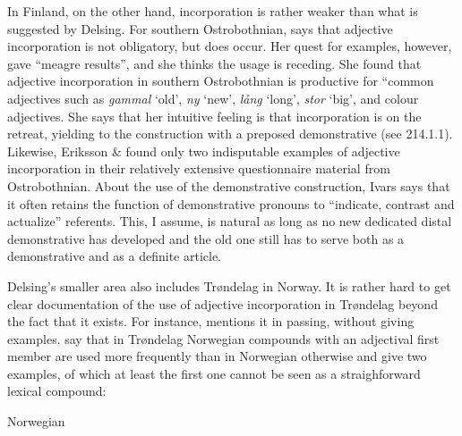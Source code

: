 \begin{styleBodytextC}
In Finland, on the other hand, incorporation is rather weaker than what is suggested by Delsing. For southern Ostrobothnian, \citet{Ivars2005} says that adjective incorporation is not obligatory, but does occur. Her quest for examples, however, gave “meagre results”, and she thinks the usage is receding. She found that adjective incorporation in southern Ostrobothnian is productive for “common adjectives such as \textit{gammal} ‘old’, \textit{ny} ‘new’, \textit{lång} ‘long’, \textit{stor} ‘big’, and colour adjectives. She says that her intuitive feeling is that incorporation is on the retreat, yielding to the construction with a preposed demonstrative (see 214.1.1).  Likewise, Eriksson \& \citet{Rendahl1999} found only two indisputable examples of adjective incorporation in their relatively extensive questionnaire material from Ostrobothnian. About the use of the demonstrative construction, Ivars says that it often retains the function of demonstrative pronouns to “indicate, contrast and actualize” referents. This, I assume, is natural as long as no new dedicated distal demonstrative has developed and the old one still has to serve both as a demonstrative and as a definite article. 

\end{styleBodytextC}

\begin{styleBodytextC}
Delsing’s smaller area also includes Trøndelag in Norway. It is rather hard to get clear documentation of the use of adjective incorporation in Trøndelag beyond the fact that it exists. For instance, \citet[161]{Vangsnes2003} mentions it in passing, without giving examples. \citet[161]{FaarlundEtAl1997} say that in Trøndelag Norwegian compounds with an adjectival first member are used more frequently than in Norwegian otherwise and give two examples, of which at least the first one cannot be seen as a straighforward lexical compound: 

\end{styleBodytextC}


\begin{listWWNumileveli}
\item 

\begin{styleExample}
Norwegian 

\end{styleExample}

\end{listWWNumileveli}

